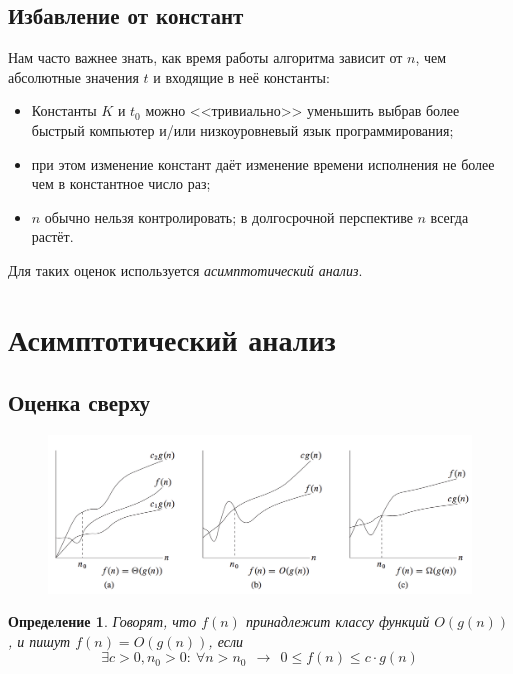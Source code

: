 \documentclass[12pt,a4paper]{report}
\newtheorem*{definition}{Определение}
\begin{document}
\subsection*{Избавление от констант}

Нам часто важнее знать, как время работы алгоритма зависит от $n$, чем абсолютные значения $t$ и входящие в неё константы: 
\begin{itemize}
\item Константы $K$ и $t_0$ можно <<тривиально>> уменьшить выбрав более быстрый компьютер и/или низкоуровневый язык программирования;
\item при этом изменение констант даёт изменение времени исполнения не более чем в константное число раз;
\item $n$ обычно нельзя контролировать; в долгосрочной перспективе $n$ всегда растёт. 
\end{itemize}

Для таких оценок используется {\em асимптотический анализ}.

\section*{Асимптотический анализ}

\subsection*{Оценка сверху}


\begin{figure}[!ht]
\centering
\includegraphics[width=17cm]{classes.png}
\end{figure}

\begin{definition}
Говорят, что $f(n)$ принадлежит классу функций $O(g(n))$, и пишут $f(n)=O(g(n))$, если
$$
\exists c>0, n_0>0:~ \forall n > n_0 ~~\to~~ 0 \leqslant f(n) \leqslant c \cdot g(n)
$$

\end{definition}
\end{document}
